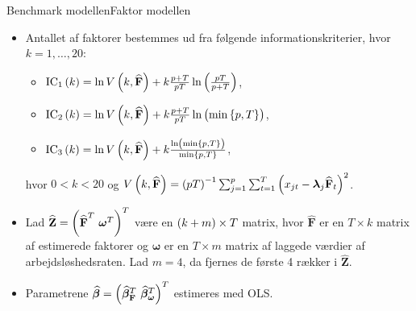 \begin{frame}{Benchmark modellen}{Faktor modellen}
\begin{itemize}
\item Antallet af faktorer bestemmes ud fra følgende informationskriterier, hvor \(k = 1, \ldots, 20\):
\begin{itemize}
\item $\text{IC}_1 \del{k} = \ln V \del{k, \widehat{\mathbf{F}}} + k \frac{p + T}{p T} \ln \del{\frac{p T}{p + T}}$,
\item $\text{IC}_2 \del{k} = \ln V \del{k, \widehat{\mathbf{F}}} + k \frac{p + T}{p T} \ln \del{ \min \cbr{p, T}}$,
\item $\text{IC}_3 \del{k} = \ln V \del{k, \widehat{\mathbf{F}}} + k \frac{\ln \del{\min \cbr{p, T}}}{\min \cbr{p, T}}$,
\end{itemize}
hvor  \(0 < k < 20\) og \(V \del{k, \widehat{\mathbf{F}}} = \del{p T}^{-1} \sum_{j=1}^p \sum_{t=1}^{T} \del{x_{jt} -\boldsymbol{\lambda}_j \widehat{\mathbf{F}}_t}^2\).
\item Lad \(\widehat{\textbf{Z}} = \del{\widehat{{\textbf{F}}}^T \ \boldsymbol{\omega}^T}^T\) være en \(\del{k+m} \times T\) matrix, hvor \(\widehat{{\textbf{F}}}\) er en \(T \times k\) matrix af estimerede faktorer og \(\boldsymbol{\omega}\) er en \(T \times m\) matrix af laggede værdier af arbejdsløshedsraten.
Lad \(m = 4\), da fjernes de første 4 rækker i \(\widehat{\textbf{Z}}\).
\item Parametrene $\widehat{\boldsymbol{\beta}} = \del{ \widehat{\boldsymbol{\beta}}^T_{\textbf{F}} \ \widehat{\boldsymbol{\beta}}^T_{\boldsymbol{\omega}}}^T$ estimeres med OLS.
\end{itemize}
\end{frame}

